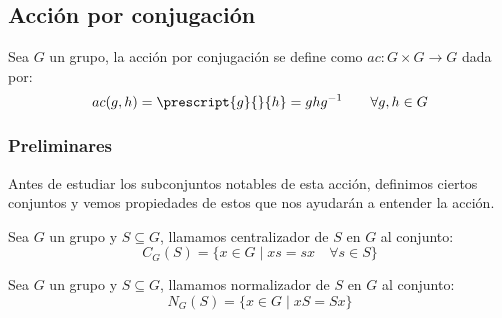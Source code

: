 \subsection{Acción por conjugación}
\noindent
Sea $G$ un grupo, la acción por conjugación se define como $ac:G\times G\to G$ dada por:
\begin{equation*}
    ac(g,h) = \prescript{g}{}{h} = ghg^{-1} \qquad \forall g,h\in G
\end{equation*}

\subsubsection{Preliminares}
\noindent
Antes de estudiar los subconjuntos notables de esta acción, definimos ciertos conjuntos y vemos propiedades de estos que nos ayudarán a entender la acción.

\begin{definicion}[Centralizador]
    Sea $G$ un grupo y $S\subseteq G$, llamamos centralizador de $S$ en $G$ al conjunto:
    \begin{equation*}
        C_G(S) = \{x\in G \mid xs = sx \quad \forall s\in S\}
    \end{equation*}
\end{definicion}

\begin{definicion}[Normalizador]
    Sea $G$ un grupo y $S\subseteq G$, llamamos normalizador de $S$ en $G$ al conjunto:
    \begin{equation*}
        N_G(S) = \{x\in G \mid xS = Sx\}
    \end{equation*}
\end{definicion}

